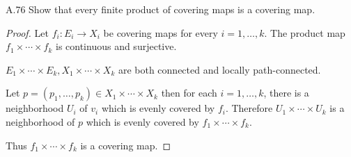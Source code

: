 \begin{exercise}{A.76}
    Show that every finite product of covering maps is a covering map.
\end{exercise}

\begin{proof}
    Let \( f_{i}: E_{i} \to X_{i} \) be covering maps for every \( i = 1, \ldots, k \). The product map \( f_{1} \times \cdots \times f_{k} \) is continuous and surjective.

    \( E_{1} \times \cdots \times E_{k}, X_{1} \times \cdots \times X_{k} \) are both connected and locally path-connected.

    Let \( p = (p_{1}, \ldots, p_{k}) \in X_{1} \times \cdots \times X_{k} \) then for each \( i = 1, \ldots, k \), there is a neighborhood \( U_{i} \) of \( v_{i} \) which is evenly covered by \( f_{i} \). Therefore \( U_{1} \times \cdots \times U_{k} \) is a neighborhood of \( p \) which is evenly covered by \( f_{1} \times \cdots \times f_{k} \).

    Thus \( f_{1} \times \cdots \times f_{k} \) is a covering map.
\end{proof}

